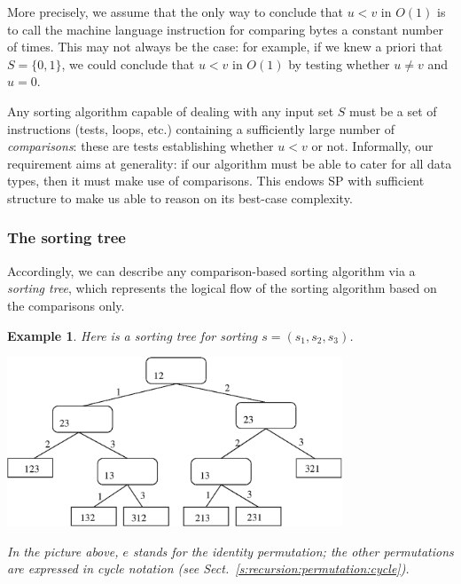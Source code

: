 \documentclass[a4paper]{book}
\theoremstyle{changebreak}                %
\newtheorem{eg}[result]{Example}
\begin{document}
More precisely, we assume that the only way to conclude that $u<v$ in
$O(1)$ is to call the machine language
instruction for comparing bytes a
constant number of times. This may not always be the
case: for example, if we knew a priori that $S=\{0,1\}$, we could
conclude that $u<v$ in $O(1)$ by testing whether $u\not=v$ and
$u=0$. 

Any sorting algorithm capable of dealing with any input
set $S$ must be a set of instructions
(tests, loops, etc.)  containing a
sufficiently large number of {\it comparisons}:
these are tests establishing whether $u<v$ or not. Informally, our
requirement aims at generality: if our algorithm must be able to cater
for all data types, then it must make use of comparisons. This endows
SP with sufficient structure to make us able to reason on its
best-case complexity.

\subsubsection{The sorting tree}
Accordingly, we can describe any comparison-based sorting algorithm
via a {\it sorting tree}, which represents the
logical flow of the sorting algorithm based on the comparisons only.

\begin{eg}
Here is a sorting tree for sorting $s=(s_1,s_2,s_3)$.
\begin{center}
\includegraphics[width=10cm]{dectree}
\end{center}
In the picture above, $e$ stands for the identity
permutation; the other permutations are
expressed in cycle notation (see
Sect.~\ref{s:recursion:permutation:cycle}).
\end{eg}
\end{document}
